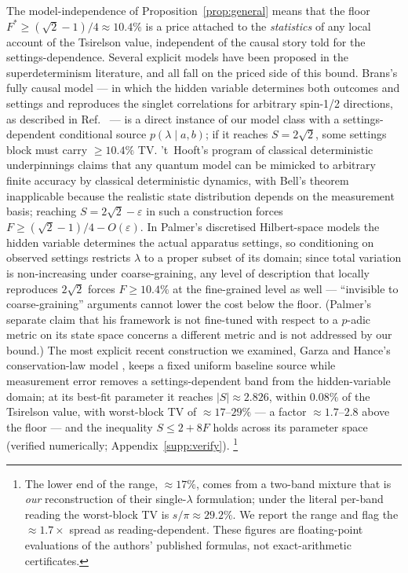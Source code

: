 \documentclass[aps,pra,reprint,superscriptaddress,floatfix]{revtex4-2}
\begin{document}
The model-independence of Proposition~\ref{prop:general} means that the
floor $F^*\ge(\sqrt2-1)/4\approx10.4\%$ is a price attached to the
\emph{statistics} of any local account of the Tsirelson value, independent
of the causal story told for the settings-dependence. Several explicit
models have been proposed in the superdeterminism literature, and all fall
on the priced side of this bound. Brans's fully causal model
\cite{brans1988} --- in which the hidden variable determines both outcomes
and settings and reproduces the singlet correlations for arbitrary spin-1/2
directions, as described in Ref.~ --- is a direct
instance of our model class with a settings-dependent conditional source
$p(\lambda\mid a,b)$; if it reaches $S=2\sqrt2$, some settings block must
carry $\ge10.4\%$ TV. 't~Hooft's program of classical deterministic underpinnings
\cite{tHooft2021} claims that any quantum model can be mimicked to
arbitrary finite accuracy by classical deterministic dynamics, with Bell's
theorem inapplicable because the realistic state distribution depends on
the measurement basis; reaching $S=2\sqrt2-\varepsilon$ in such a
construction forces $F\ge(\sqrt2-1)/4-O(\varepsilon)$. In Palmer's
discretised Hilbert-space models \cite{palmer2022,palmer2024} the hidden
variable determines the actual apparatus settings, so conditioning on
observed settings restricts $\lambda$ to a proper subset of its domain;
since total variation is non-increasing under coarse-graining, any level of
description that locally reproduces $2\sqrt2$ forces $F\ge10.4\%$ at the
fine-grained level as well --- ``invisible to coarse-graining'' arguments
cannot lower the cost below the floor. (Palmer's separate claim that his
framework is not fine-tuned with respect to a $p$-adic metric on its state
space concerns a different metric and is not addressed by our bound.) The
most explicit recent
construction we examined, Garza and Hance's conservation-law model
\cite{garzahance2025}, keeps a fixed uniform baseline source while
measurement error removes a settings-dependent band from the
hidden-variable domain; at its best-fit parameter it reaches
$|S|\approx2.826$, within $0.08\%$ of the Tsirelson value, with
worst-block TV of $\approx17$--$29\%$ --- a factor $\approx1.7$--$2.8$
above the floor --- and the inequality $S\le2+8F$ holds across its
parameter space (verified numerically; Appendix~\ref{supp:verify}).
\footnote{The lower end of the range, $\approx17\%$, comes from a
two-band mixture that is \emph{our} reconstruction of their
single-$\lambda$ formulation; under the literal per-band reading the
worst-block TV is $s/\pi\approx29.2\%$. We report the range and flag the
$\approx1.7\times$ spread as reading-dependent. These figures are
floating-point evaluations of the authors' published formulas, not
exact-arithmetic certificates.}
\end{document}
